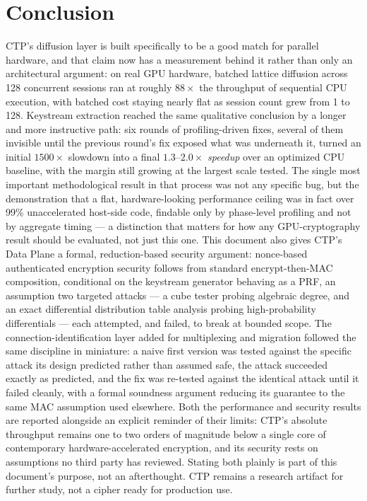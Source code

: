 \documentclass[twocolumn,10pt,journal,compsoc]{IEEEtran}
\begin{document}
\section{Conclusion}
CTP's diffusion layer is built specifically to be a good match for parallel hardware, and that claim now has a measurement behind it rather than only an architectural argument: on real GPU hardware, batched lattice diffusion across 128 concurrent sessions ran at roughly $88\times$ the throughput of sequential CPU execution, with batched cost staying nearly flat as session count grew from 1 to 128. Keystream extraction reached the same qualitative conclusion by a longer and more instructive path: six rounds of profiling-driven fixes, several of them invisible until the previous round's fix exposed what was underneath it, turned an initial $1500\times$ slowdown into a final $1.3$--$2.0\times$ \emph{speedup} over an optimized CPU baseline, with the margin still growing at the largest scale tested. The single most important methodological result in that process was not any specific bug, but the demonstration that a flat, hardware-looking performance ceiling was in fact over 99\% unaccelerated host-side code, findable only by phase-level profiling and not by aggregate timing --- a distinction that matters for how any GPU-cryptography result should be evaluated, not just this one. This document also gives CTP's Data Plane a formal, reduction-based security argument: nonce-based authenticated encryption security follows from standard encrypt-then-MAC composition, conditional on the keystream generator behaving as a PRF, an assumption two targeted attacks --- a cube tester probing algebraic degree, and an exact differential distribution table analysis probing high-probability differentials --- each attempted, and failed, to break at bounded scope. The connection-identification layer added for multiplexing and migration followed the same discipline in miniature: a naive first version was tested against the specific attack its design predicted rather than assumed safe, the attack succeeded exactly as predicted, and the fix was re-tested against the identical attack until it failed cleanly, with a formal soundness argument reducing its guarantee to the same MAC assumption used elsewhere. Both the performance and security results are reported alongside an explicit reminder of their limits: CTP's absolute throughput remains one to two orders of magnitude below a single core of contemporary hardware-accelerated encryption, and its security rests on assumptions no third party has reviewed. Stating both plainly is part of this document's purpose, not an afterthought. CTP remains a research artifact for further study, not a cipher ready for production use.
\end{document}
